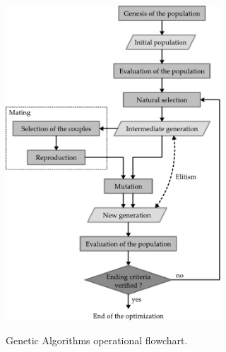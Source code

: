 \documentclass{ametsoc}
\begin{document}
\begin{figure}[t]
	\begin{center}
		\noindent\includegraphics[width=19pc,angle=0]{fig02.pdf}\\
	\end{center}
	\caption{Genetic Algorithms operational flowchart.}
	\label{fig:structure_gas}
\end{figure}
\end{document}

